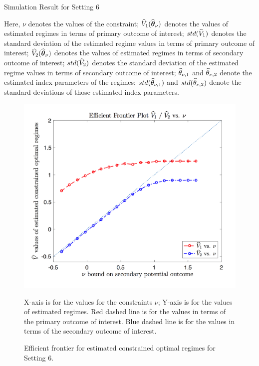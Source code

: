 \begin{table}[!htbp]
	\caption {Simulation Result for Setting 6}
	\centering
	{\tt
		
	}
	\justify
	Here, $\nu$ denotes the values of the constraint; $\widehat{V}_1(\widehat{\boldsymbol{\theta}}_{\nu})$ denotes the values of estimated regimes in terms of primary outcome of interest; $std(\widehat{V}_1)$ denotes the standard deviation of the estimated regime values in terms of primary outcome of interest; $\widehat{V}_2(\widehat{\boldsymbol{\theta}}_{\nu})$ denotes the values of estimated regimes in terms of secondary outcome of interest; $std(\widehat{V}_2)$ denotes the standard deviation of the estimated regime values in terms of secondary outcome of interest; $\widehat{\theta}_{\nu,1}$ and $\widehat{\theta}_{\nu,2}$ denote the estimated index parameters of the regimes; $std(\widehat{\theta}_{\nu,1})$ and $std(\widehat{\theta}_{\nu,2})$ denote the standard deviations of those estimated index parameters.	
\end{table} 
\begin{figure}[!htb]
	\centering
	\includegraphics[width=.9\linewidth]{./Chapter-1/figs/efficient_plot6.png}
	\caption{Efficient frontier for estimated constrained optimal regimes for Setting 6.}
	\label{fig:6}
	\justify
X-axis is for the values for the constraints $\nu$; Y-axis is for the values of estimated regimes. Red dashed line is for the values in terms of the primary outcome of interest. Blue dashed line is for the values in terms of the secondary outcome of interest.
\end{figure}
